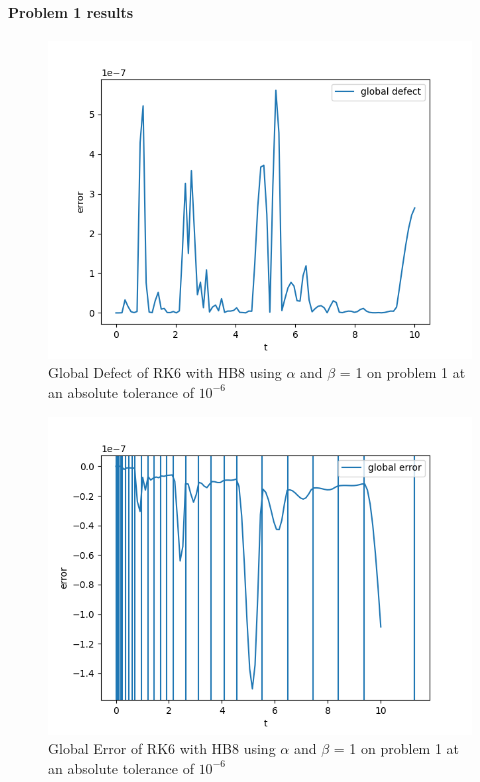 \documentclass{article}
\begin{document}
\paragraph{Problem 1 results}
\begin{figure}[H]
\centering
\includegraphics[width=0.7\linewidth]{./figures/static_alpha_rk6_with_hb8_p1_global_defect}
\caption{Global Defect of RK6 with HB8 using $\alpha$ and $\beta$ = 1 on problem 1 at an absolute tolerance of $10^{-6}$}
\label{fig:static_alpha_rk6_with_hb8_p1_global_defect}
\end{figure}

\begin{figure}[H]
\centering
\includegraphics[width=0.7\linewidth]{./figures/static_alpha_rk6_with_hb8_p1_global_error}
\caption{Global Error of RK6 with HB8 using $\alpha$ and $\beta$ = 1 on problem 1 at an absolute tolerance of $10^{-6}$}
\label{fig:static_alpha_rk6_with_hb8_p1_global_error}
\end{figure}
\end{document}
